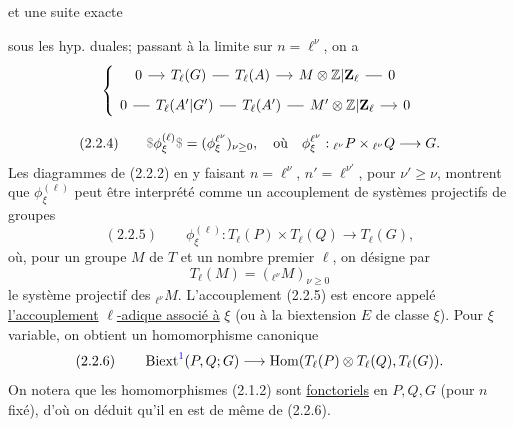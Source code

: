 et  une suite exacte

sous les hyp. duales; passant à la limite sur $n=\ell^\nu$, on a
\[
\left\{\begin{gathered}
\diagram{\begin{tikzcd}[ampersand replacement=\&, column sep=small]0 \arrow[r] \& T_\ell(\unsure{G}) \arrow[r,no head] \& T_\ell(A) \arrow[r] \& M\otimes\unsure{\mathbb Z|\mathbf Z}_\ell \arrow[r,no head] \& 0\end{tikzcd}}\\
\diagram{\begin{tikzcd}[ampersand replacement=\&, column sep=small]0 \arrow[r,no head] \& T_\ell(\unsure{A'|G'}) \arrow[r,no head] \& T_\ell(A') \arrow[r,no head] \& M'\otimes\unsure{\mathbb Z|\mathbf Z}_\ell \arrow[r] \& 0\end{tikzcd}}
\end{gathered}\right.
\]


\[
(2.2.4)\qquad\deleted{\unsure{\$}}\phi^{(\ell)}_\xi\deleted{\unsure{\$}}=(\phi^{\ell^\nu}_\xi)_{\nu\geq0},\quad\text{où}\quad\phi^{\ell^\nu}_\xi:{}_{\ell^\nu}P\times{}_{\ell^\nu}Q\longrightarrow G.
\]
Les diagrammes  de (2.2.2) en y faisant $n=\ell^\nu$, $n'=\ell^{\nu'}$, pour $\nu'\geq\nu$, montrent que $\phi^{(\ell)}_\xi$ peut être interprété comme un accouplement de  systèmes projectifs de groupes
\[
(2.2.5)\qquad\phi^{(\ell)}_\xi:T_\ell(P)\times T_\ell(Q)\longrightarrow T_\ell(G),
\]
où, pour un groupe $M$ de $T$ et un nombre premier $\ell$, on désigne par
\[
T_\ell(M)=({}_{\ell^\nu}M)_{\nu\geq0}
\]
le système projectif des ${}_{\ell^\nu}M$. L'accouplement \deleted{\unsure{\$}} (2.2.5) est encore appelé \uline{l'accouplement} $\ell$\uline{-adique associé à} $\xi$ (ou à la biextension $E$ de classe $\xi$). Pour $\xi$ variable, on obtient un homomorphisme canonique
\[
(2.2.6)\qquad\operatorname{Biext}^{{\color{blue}1}}(P,Q;G)\longrightarrow\operatorname{Hom}(T_\ell(P)\otimes T_\ell(Q),T_\ell(G)).
\]
On notera que les homomorphismes (2.1.2) sont \uline{fonctoriels} en $P,Q,G$ (pour $n$ fixé), d'où on déduit qu'il en est de même de (2.2.6).

